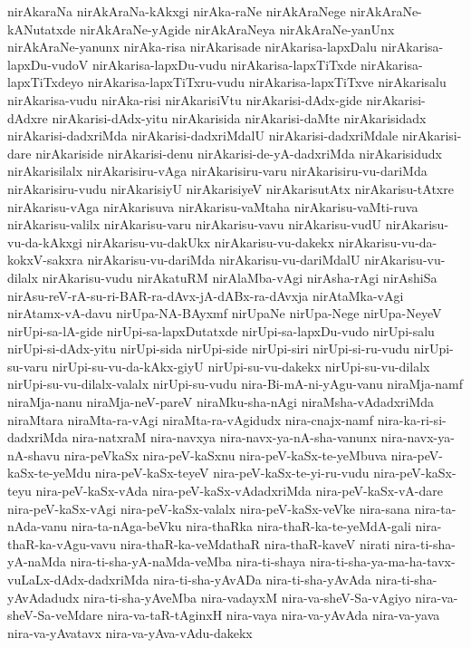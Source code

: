 {nirAkaraNa
nirAkAraNa-kAkxgi
nirAka-raNe
nirAkAraNege
nirAkAraNe-kANutatxde
nirAkAraNe-yAgide
nirAkAraNeya
nirAkAraNe-yanUnx
nirAkAraNe-yanunx
nirAka-risa
nirAkarisade
nirAkarisa-lapxDalu
nirAkarisa-lapxDu-vudoV
nirAkarisa-lapxDu-vudu
nirAkarisa-lapxTiTxde
nirAkarisa-lapxTiTxdeyo
nirAkarisa-lapxTiTxru-vudu
nirAkarisa-lapxTiTxve
nirAkarisalu
nirAkarisa-vudu
nirAka-risi
nirAkarisiVtu
nirAkarisi-dAdx-gide
nirAkarisi-dAdxre
nirAkarisi-dAdx-yitu
nirAkarisida
nirAkarisi-daMte
nirAkarisidadx
nirAkarisi-dadxriMda
nirAkarisi-dadxriMdalU
nirAkarisi-dadxriMdale
nirAkarisi-dare
nirAkariside
nirAkarisi-denu
nirAkarisi-de-yA-dadxriMda
nirAkarisidudx
nirAkarisilalx
nirAkarisiru-vAga
nirAkarisiru-varu
nirAkarisiru-vu-dariMda
nirAkarisiru-vudu
nirAkarisiyU
nirAkarisiyeV
nirAkarisutAtx
nirAkarisu-tAtxre
nirAkarisu-vAga
nirAkarisuva
nirAkarisu-vaMtaha
nirAkarisu-vaMti-ruva
nirAkarisu-valilx
nirAkarisu-varu
nirAkarisu-vavu
nirAkarisu-vudU
nirAkarisu-vu-da-kAkxgi
nirAkarisu-vu-dakUkx
nirAkarisu-vu-dakekx
nirAkarisu-vu-da-kokxV-sakxra
nirAkarisu-vu-dariMda
nirAkarisu-vu-dariMdalU
nirAkarisu-vu-dilalx
nirAkarisu-vudu
nirAkatuRM
nirAlaMba-vAgi
nirAsha-rAgi
nirAshiSa
nirAsu-reV-rA-su-ri-BAR-ra-dAvx-jA-dABx-ra-dAvxja
nirAtaMka-vAgi
nirAtamx-vA-davu
nirUpa-NA-BAyxmf
nirUpaNe
nirUpa-Nege
nirUpa-NeyeV
nirUpi-sa-lA-gide
nirUpi-sa-lapxDutatxde
nirUpi-sa-lapxDu-vudo
nirUpi-salu
nirUpi-si-dAdx-yitu
nirUpi-sida
nirUpi-side
nirUpi-siri
nirUpi-si-ru-vudu
nirUpi-su-varu
nirUpi-su-vu-da-kAkx-giyU
nirUpi-su-vu-dakekx
nirUpi-su-vu-dilalx
nirUpi-su-vu-dilalx-valalx
nirUpi-su-vudu
nira-Bi-mA-ni-yAgu-vanu
niraMja-namf
niraMja-nanu
niraMja-neV-pareV
niraMku-sha-nAgi
niraMsha-vAdadxriMda
niraMtara
niraMta-ra-vAgi
niraMta-ra-vAgidudx
nira-cnajx-namf
nira-ka-ri-si-dadxriMda
nira-natxraM
nira-navxya
nira-navx-ya-nA-sha-vanunx
nira-navx-ya-nA-shavu
nira-peVkaSx
nira-peV-kaSxnu
nira-peV-kaSx-te-yeMbuva
nira-peV-kaSx-te-yeMdu
nira-peV-kaSx-teyeV
nira-peV-kaSx-te-yi-ru-vudu
nira-peV-kaSx-teyu
nira-peV-kaSx-vAda
nira-peV-kaSx-vAdadxriMda
nira-peV-kaSx-vA-dare
nira-peV-kaSx-vAgi
nira-peV-kaSx-valalx
nira-peV-kaSx-veVke
nira-sana
nira-ta-nAda-vanu
nira-ta-nAga-beVku
nira-thaRka
nira-thaR-ka-te-yeMdA-gali
nira-thaR-ka-vAgu-vavu
nira-thaR-ka-veMdathaR
nira-thaR-kaveV
nirati
nira-ti-sha-yA-naMda
nira-ti-sha-yA-naMda-veMba
nira-ti-shaya
nira-ti-sha-ya-ma-ha-tavx-vuLaLx-dAdx-dadxriMda
nira-ti-sha-yAvADa
nira-ti-sha-yAvAda
nira-ti-sha-yAvAdadudx
nira-ti-sha-yAveMba
nira-vadayxM
nira-va-sheV-Sa-vAgiyo
nira-va-sheV-Sa-veMdare
nira-va-taR-tAginxH
nira-vaya
nira-va-yAvAda
nira-va-yava
nira-va-yAvatavx
nira-va-yAva-vAdu-dakekx
}
